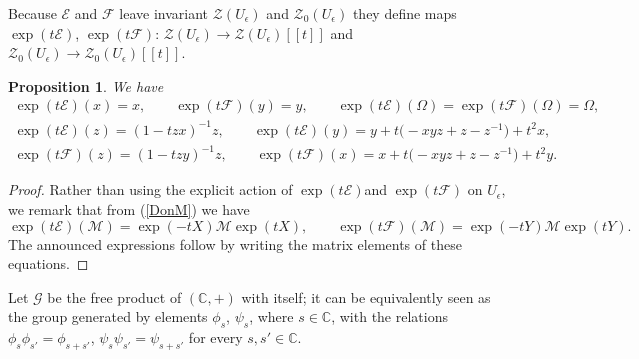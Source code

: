 \documentclass[pdftex]{sigma}%
\numberwithin{equation}{section}
\numberwithin{figure}{section}
\newtheorem{prop}[teo]{Proposition}
\newcommand{\e}{\epsilon}
\begin{document}
Because ${\mathcal E}$ and ${\mathcal F}$ leave invariant $\mathcal{Z}(U_\e)$ and $\mathcal{Z}_0(U_\e)$ they define maps $\exp(t{\mathcal E})$, $\exp(t{\mathcal F})$: ${\mathcal Z}(U_\e)\rightarrow {\mathcal Z}(U_\e)[[t]]$ and ${\mathcal Z}_0(U_\e)\rightarrow {\mathcal Z}_0(U_\e)[[t]]$.
\begin{prop} \label{actioncenter}
We have
\begin{gather*}
\exp(t{\mathcal E})(x) =x,\qquad \exp(t{\mathcal F})(y) =y,\qquad \exp(t{\mathcal E})(\Omega) =\exp(t{\mathcal F})(\Omega)=\Omega,
\\
\exp(t{\mathcal E})(z)=(1-tzx)^{-1}z,\qquad \exp(t{\mathcal E})(y)=y+t\big({-}xyz+z-z^{-1}\big)+t^2x,
\\
\exp(t{\mathcal F})(z)=(1-tzy)^{-1}z,\qquad \exp(t{\mathcal F})(x)=x+t\big({-}xyz+z-z^{-1}\big)+t^2y.
\end{gather*}
\end{prop}

\begin{proof}
Rather than using the explicit action of $\exp(t{\mathcal E})$and $\exp(t{\mathcal F})$ on $U_\epsilon$, we remark that from (\ref{DonM}) we have
\begin{equation}\label{coadjointactionproof}
\exp(t{\mathcal E})({\mathcal M})=\exp(-tX){\mathcal M}\exp(tX),\qquad
\exp(t{\mathcal F})({\mathcal M})=\exp(-tY){\mathcal M}\exp(tY).
\end{equation}
The announced expressions follow by writing the matrix elements of these equations.\end{proof}

Let ${\mathcal G}$ be the free product of $({\mathbb C}, +)$ with itself; it can be equivalently seen as the group generated by elements $\phi_s$, $\psi_s$, where $s\in {\mathbb C}$, with the relations $\phi_s\phi_{s'}=\phi_{s+s'}$, $\psi_s\psi_{s'}=\psi_{s+s'}$ for every $s, s'\in {\mathbb C}$.
\end{document}
